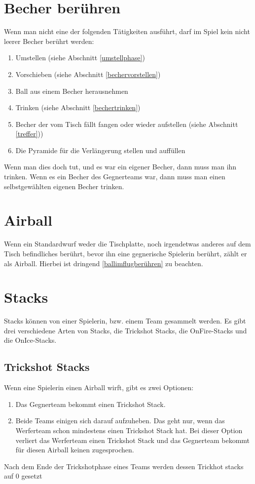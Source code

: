 \documentclass[a5paper, 12pt]{book}
\begin{document}
\section{Becher berühren}\label{sec:becherberühren}
Wenn man nicht eine der folgenden Tätigkeiten ausführt, darf im Spiel kein nicht leerer Becher berührt werden:
\begin{enumerate} [(1)]
    \item Umstellen (siehe Abschnitt \ref{umstellphase})
    \item Vorschieben (siehe Abschnitt \ref{bechervorstellen})
    \item Ball aus einem Becher herausnehmen
    \item Trinken (siehe Abschnitt \ref{bechertrinken})
    \item Becher der vom Tisch fällt fangen oder wieder aufstellen (siehe Abschnitt \ref{treffer}))
    \item Die Pyramide für die Verlängerung stellen und auffüllen
    
\end{enumerate}
Wenn man dies doch tut, und es war ein eigener Becher, dann muss man ihn trinken. Wenn es ein Becher des Gegnerteams war, dann muss man einen selbstgewählten eigenen Becher trinken. 
\section{Airball}\label{sec:Airball}
Wenn ein Standardwurf weder die Tischplatte, noch irgendetwas anderes auf dem Tisch befindliches berührt, bevor ihn eine gegnerische Spielerin berührt, zählt er als Airball. Hierbei ist dringend \ref{ballimflugberühren} zu beachten. 
\section{Stacks}\label{sec:stacks}
Stacks können von einer Spielerin, bzw. einem Team gesammelt werden. Es gibt drei verschiedene Arten von Stacks, die Trickshot Stacks, die OnFire-Stacks und die OnIce-Stacks.
\subsection{Trickshot Stacks}\label{Trickshot Stacks}
Wenn eine Spielerin einen Airball wirft, gibt es zwei Optionen:
\begin{enumerate} [(1)]
    \item Das Gegnerteam bekommt einen Trickshot Stack.
    \item Beide Teams einigen sich darauf aufzuheben. Das geht nur, wenn das Werferteam schon mindestens einen Trickshot Stack hat. Bei dieser Option verliert das Werferteam einen Trickshot Stack und das Gegnerteam bekommt für diesen Airball keinen zugesprochen. 
\end{enumerate}
Nach dem Ende der Trickshotphase eines Teams werden dessen Trickhot stacks auf 0 gesetzt
\end{document}
